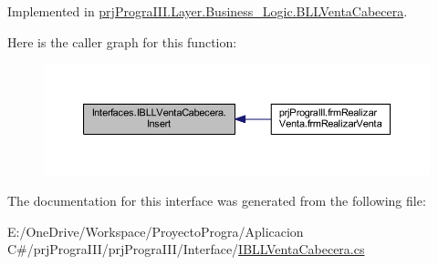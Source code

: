 Implemented in \hyperlink{classprj_progra_i_i_i_1_1_layer_1_1_business___logic_1_1_b_l_l_venta_cabecera_a4e982cb2c77f88dd3d2ae1f8228ac3ae}{prj\+Progra\+I\+I\+I.\+Layer.\+Business\+\_\+\+Logic.\+B\+L\+L\+Venta\+Cabecera}.

Here is the caller graph for this function\+:
\nopagebreak
\begin{figure}[H]
\begin{center}
\leavevmode
\includegraphics[width=350pt]{interface_interfaces_1_1_i_b_l_l_venta_cabecera_a28aab27efa8b0bfbac32d24d814e7a76_icgraph}
\end{center}
\end{figure}


The documentation for this interface was generated from the following file\+:\begin{DoxyCompactItemize}
\item 
E\+:/\+One\+Drive/\+Workspace/\+Proyecto\+Progra/\+Aplicacion C\#/prj\+Progra\+I\+I\+I/prj\+Progra\+I\+I\+I/\+Interface/\hyperlink{_i_b_l_l_venta_cabecera_8cs}{I\+B\+L\+L\+Venta\+Cabecera.\+cs}\end{DoxyCompactItemize}
